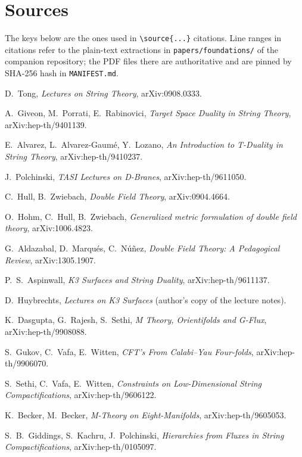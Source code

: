 \chapter*{Sources}
\sloppy
The keys below are the ones used in \verb|\source{...}| citations. Line ranges in citations refer to the
plain-text extractions in \texttt{papers/foundations/} of the companion repository; the PDF files there
are authoritative and are pinned by SHA-256 hash in \texttt{MANIFEST.md}.
\begin{description}[leftmargin=2.2cm,style=nextline,font=\normalfont\sffamily\bfseries]
\item[Tong] D.~Tong, \emph{Lectures on String Theory}, arXiv:0908.0333.
\item[GPR] A.~Giveon, M.~Porrati, E.~Rabinovici, \emph{Target Space Duality in String Theory}, arXiv:hep-th/9401139.
\item[AAL] E.~Alvarez, L.~Alvarez-Gaum\'e, Y.~Lozano, \emph{An Introduction to T-Duality in String Theory}, arXiv:hep-th/9410237.
\item[Pol] J.~Polchinski, \emph{TASI Lectures on D-Branes}, arXiv:hep-th/9611050.
\item[HZ] C.~Hull, B.~Zwiebach, \emph{Double Field Theory}, arXiv:0904.4664.
\item[HHZ] O.~Hohm, C.~Hull, B.~Zwiebach, \emph{Generalized metric formulation of double field theory}, arXiv:1006.4823.
\item[AMN] G.~Aldazabal, D.~Marqu\'es, C.~N\'u\~nez, \emph{Double Field Theory: A Pedagogical Review}, arXiv:1305.1907.
\item[Asp] P.~S.~Aspinwall, \emph{K3 Surfaces and String Duality}, arXiv:hep-th/9611137.
\item[Huy] D.~Huybrechts, \emph{Lectures on K3 Surfaces} (author's copy of the lecture notes).
\item[DRS] K.~Dasgupta, G.~Rajesh, S.~Sethi, \emph{M Theory, Orientifolds and G-Flux}, arXiv:hep-th/9908088.
\item[GVW] S.~Gukov, C.~Vafa, E.~Witten, \emph{CFT's From Calabi--Yau Four-folds}, arXiv:hep-th/9906070.
\item[SVW] S.~Sethi, C.~Vafa, E.~Witten, \emph{Constraints on Low-Dimensional String Compactifications}, arXiv:hep-th/9606122.
\item[BB] K.~Becker, M.~Becker, \emph{M-Theory on Eight-Manifolds}, arXiv:hep-th/9605053.
\item[GKP] S.~B.~Giddings, S.~Kachru, J.~Polchinski, \emph{Hierarchies from Fluxes in String Compactifications}, arXiv:hep-th/0105097.

\end{description}
